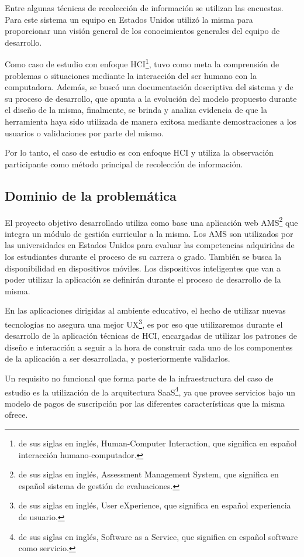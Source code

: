 Entre algunas técnicas de recolección de información se utilizan las encuestas\citep{robson_real_2011}. Para este sistema un equipo en Estados Unidos utilizó la misma para proporcionar una visión general de los conocimientos generales del equipo de desarrollo.

Como caso de estudio con enfoque HCI\footnote{de sus siglas en inglés, Human-Computer Interaction, que significa en español interacción humano-computador.}, tuvo como meta la comprensión de problemas o situaciones mediante la interacción del ser humano con la computadora. Además, se buscó una documentación descriptiva del sistema y de su proceso de desarrollo, que apunta a la evolución del modelo propuesto durante el diseño de la misma, finalmente, se brinda y analiza evidencia de que la herramienta haya sido utilizada de manera exitosa mediante demostraciones a los usuarios o validaciones por parte del mismo\citep{lazar_research_2010}. 

Por lo tanto, el caso de estudio es con enfoque HCI y utiliza la observación participante como método principal de recolección de información.

\subsection{Dominio de la problemática}
El proyecto objetivo desarrollado utiliza como base una aplicación web AMS\footnote{de sus siglas en inglés, Assessment Management System, que significa en español sistema de gestión de evaluaciones.} que integra un módulo de gestión curricular a la misma. Los AMS son utilizados por las universidades en Estados Unidos para evaluar las competencias adquiridas de los estudiantes durante el proceso de su carrera o grado. También se busca la disponibilidad en dispositivos móviles. Los dispositivos inteligentes que van a poder utilizar la aplicación se definirán durante el proceso de desarrollo de la misma.

En las aplicaciones dirigidas al ambiente educativo, el hecho de utilizar nuevas tecnologías no asegura una mejor UX\footnote{de sus siglas en inglés, User eXperience, que significa en español experiencia de usuario.}, es por eso que utilizaremos durante el desarrollo de la aplicación técnicas de HCI\citep{lazar_research_2010}, encargadas de utilizar los patrones de diseño e interacción a seguir a la hora de construir cada uno de los componentes de la aplicación a ser desarrollada, y posteriormente validarlos.

Un requisito no funcional que forma parte de la infraestructura del caso de estudio es la utilización de la arquitectura SaaS\footnote{de sus siglas en inglés, Software as a Service, que significa en español software como servicio.}, ya que provee servicios bajo un modelo de pagos de suscripción por las diferentes características que la misma ofrece.

